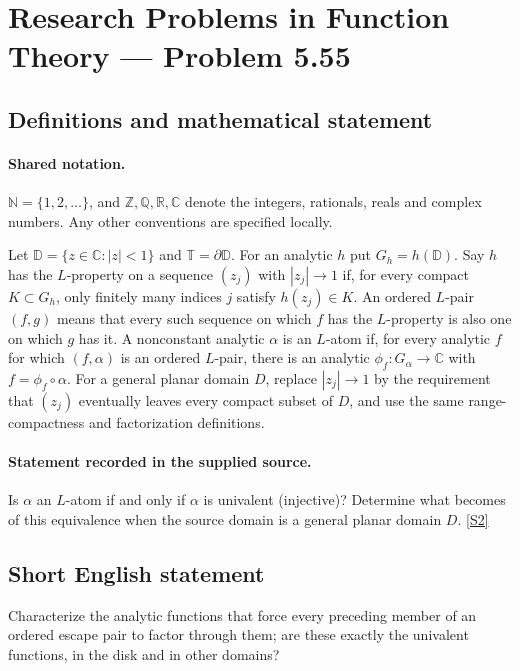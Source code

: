 \documentclass[11pt]{book}
\newcommand{\sref}[2]{\hyperlink{source:#1:#2}{[S#2]}}
\begin{document}
\section{Research Problems in Function Theory — Problem 5.55}\label{statement}

\subsection{Definitions and mathematical statement}

\paragraph{Shared notation.}$\mathbb N=\{1,2,\ldots\}$, and $\mathbb Z,\mathbb Q,\mathbb R,\mathbb C$ denote the integers, rationals, reals and complex numbers. Any other conventions are specified locally.


Let $\mathbb D=\{z\in\mathbb C:|z|<1\}$ and $\mathbb T=\partial\mathbb D$. For an analytic $h$ put $G_h=h(\mathbb D)$. Say $h$ has the $L$-property on a sequence $(z_j)$ with $|z_j|\to1$ if, for every compact $K\subset G_h$, only finitely many indices $j$ satisfy $h(z_j)\in K$. An ordered $L$-pair $(f,g)$ means that every such sequence on which $f$ has the $L$-property is also one on which $g$ has it. A nonconstant analytic $\alpha$ is an $L$-atom if, for every analytic $f$ for which $(f,\alpha)$ is an ordered $L$-pair, there is an analytic $\phi_f:G_\alpha\to\mathbb C$ with $f=\phi_f\circ\alpha$. For a general planar domain $D$, replace $|z_j|\to1$ by the requirement that $(z_j)$ eventually leaves every compact subset of $D$, and use the same range-compactness and factorization definitions.
\paragraph{Statement recorded in the supplied source.}
Is $\alpha$ an $L$-atom if and only if $\alpha$ is univalent (injective)? Determine what becomes of this equivalence when the source domain is a general planar domain $D$. \sref{statement}{2}
\subsection{Short English statement}
Characterize the analytic functions that force every preceding member of an ordered escape pair to factor through them; are these exactly the univalent functions, in the disk and in other domains?
\end{document}
